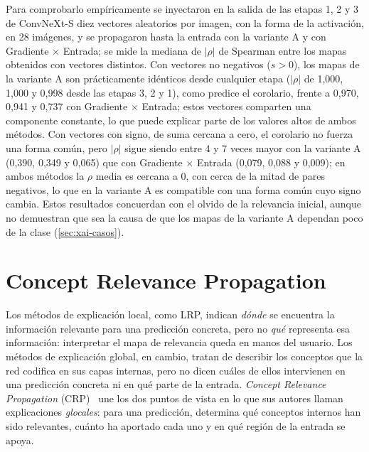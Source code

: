 Para comprobarlo empíricamente se inyectaron en la salida de las etapas 1, 2 y 3 de ConvNeXt-S diez vectores aleatorios por imagen, con la forma de la activación, en 28 imágenes, y se propagaron hasta la entrada con la variante A y con Gradiente $\times$ Entrada; se mide la mediana de $|\rho|$ de Spearman entre los mapas obtenidos con vectores distintos. Con vectores no negativos ($s > 0$), los mapas de la variante A son prácticamente idénticos desde cualquier etapa ($|\rho|$ de 1,000, 1,000 y 0,998 desde las etapas 3, 2 y 1), como predice el corolario, frente a 0,970, 0,941 y 0,737 con Gradiente $\times$ Entrada; estos vectores comparten una componente constante, lo que puede explicar parte de los valores altos de ambos métodos. Con vectores con signo, de suma cercana a cero, el corolario no fuerza una forma común, pero $|\rho|$ sigue siendo entre 4 y 7 veces mayor con la variante A (0,390, 0,349 y 0,065) que con Gradiente $\times$ Entrada (0,079, 0,088 y 0,009); en ambos métodos la $\rho$ media es cercana a 0, con cerca de la mitad de pares negativos, lo que en la variante A es compatible con una forma común cuyo signo cambia. Estos resultados concuerdan con el olvido de la relevancia inicial, aunque no demuestran que sea la causa de que los mapas de la variante A dependan poco de la clase (\cref{sec:xai-casos}).

\section{Concept Relevance Propagation}\label{sec:crp}

Los métodos de explicación local, como LRP, indican \emph{dónde} se encuentra la
información relevante para una predicción concreta, pero no \emph{qué} representa
esa información: interpretar el mapa de relevancia queda en manos del usuario. Los
métodos de explicación global, en cambio, tratan de describir los conceptos que la
red codifica en sus capas internas, pero no dicen cuáles de ellos intervienen en una
predicción concreta ni en qué parte de la entrada. \emph{Concept Relevance
Propagation} (CRP)~\cite{achtibat2023} une los dos puntos de vista en lo que sus
autores llaman explicaciones \emph{glocales}: para una predicción, determina qué
conceptos internos han sido relevantes, cuánto ha aportado cada uno y en qué región
de la entrada se apoya.

